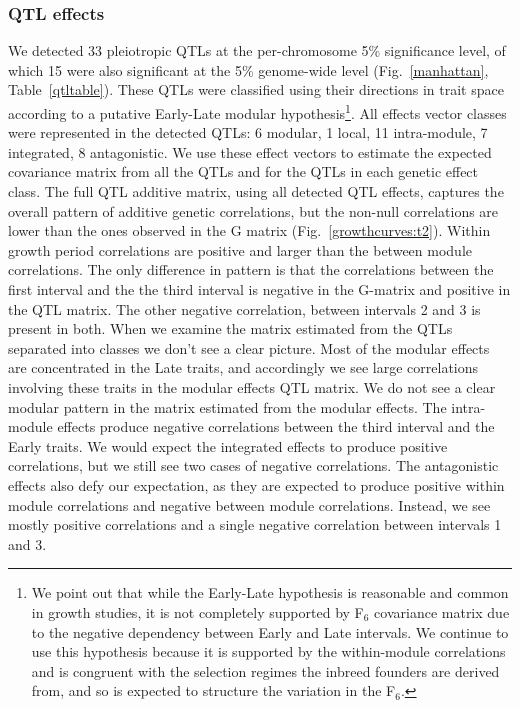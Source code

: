 \begin{refsection}
\subsubsection{QTL effects}

We detected 33 pleiotropic QTLs at the per-chromosome 5\% significance level,
of which 15 were also significant at the 5\% genome-wide level
(Fig.~\ref{manhattan}, Table~\ref{qtltable}). These QTLs were classified using
their directions in trait space according to a putative Early-Late modular
hypothesis\footnote{We point out that while the Early-Late hypothesis is
reasonable and common in growth studies, it is not completely supported by
F$_{\text{6}}$ covariance matrix due to the negative dependency between Early
and Late intervals. We continue to use this hypothesis because it is supported
by the within-module correlations and is congruent with the selection regimes
the inbreed founders are derived from, and so is expected to structure the
variation in the F$_{\text{6}}$.}. All effects vector classes were represented
in the detected QTLs: 6 modular, 1 local, 11 intra-module, 7 integrated, 8
antagonistic. We use these effect vectors to estimate the expected covariance
matrix from all the QTLs and for the QTLs in each genetic effect class. The
full QTL additive matrix, using all detected QTL effects, captures the overall
pattern of additive genetic correlations, but the non-null correlations are
lower than the ones observed in the G matrix (Fig.~\ref{growthcurves:t2}). Within growth period
correlations are positive and larger than the between module correlations. The
only difference in pattern is that the correlations between the first interval
and the the third interval is negative in the G-matrix and positive in the QTL
matrix. The other negative correlation, between intervals 2 and 3 is present
in both. When we examine the matrix estimated from the QTLs separated into
classes we don't see a clear picture. Most of the modular effects are
concentrated in the Late traits, and accordingly we see large correlations
involving these traits in the modular effects QTL matrix. We do not see a
clear modular pattern in the matrix estimated from the modular effects. The
intra-module effects produce negative correlations between the third interval
and the Early traits. We would expect the integrated effects to produce
positive correlations, but we still see two cases of negative correlations.
The antagonistic effects also defy our expectation, as they are expected to
produce positive within module correlations and negative between module
correlations. Instead, we see mostly positive correlations and a single
negative correlation between intervals 1 and 3.



\end{refsection}
